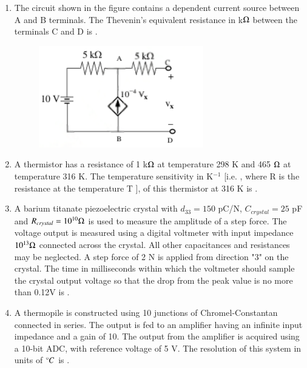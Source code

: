 \documentclass[journal,12pt,onecolumn]{IEEEtran}
\theoremstyle{remark}
\begin{document}
\begin{enumerate}
    \hfill{}

    
    
    \item The circuit shown in the figure contains a dependent current source between A and B terminals. The Thevenin's equivalent resistance in k$\ohm$ between the terminals C and D is \underline{\hspace{2cm}}.
    \begin{figure}[H]
        \centering
        \includegraphics[width=0.5\columnwidth]{q32}
        \caption*{}
        \label{Q32}
    \end{figure}

    \hfill{}
    \item A thermistor has a resistance of 1 k$\ohm$ at temperature 298 K and 465 $\ohm$ at temperature 316 K. The temperature sensitivity in K$^{-1}$ [i.e. , where R is the resistance at the temperature T ], of this thermistor at 316 K is \underline{\hspace{2cm}}.

    \hfill{}

    
    
    \item A barium titanate piezoelectric crystal with $d_{33} = 150$ pC/N, $C_{crystal} = 25$ pF and $R_{crystal} = 10^{10} \ohm$ is used to measure the amplitude of a step force. The voltage output is measured using a digital voltmeter with input impedance $10^{13} \ohm$ connected across the crystal. All other capacitances and resistances may be neglected. A step force of 2 N is applied from direction "3" on the crystal. The time in milliseconds within which the voltmeter should sample the crystal output voltage so that the drop from the peak value is no more than 0.12V is \underline{\hspace{2cm}}.

    \hfill{}

    
    
    \item A thermopile is constructed using 10 junctions of Chromel-Constantan  connected in series. The output is fed to an amplifier having an infinite input impedance and a gain of 10. The output from the amplifier is acquired using a 10-bit ADC, with reference voltage of 5 V. The resolution of this system in units of $\degree C$ is \underline{\hspace{2cm}}.


\end{enumerate}
\end{document}
